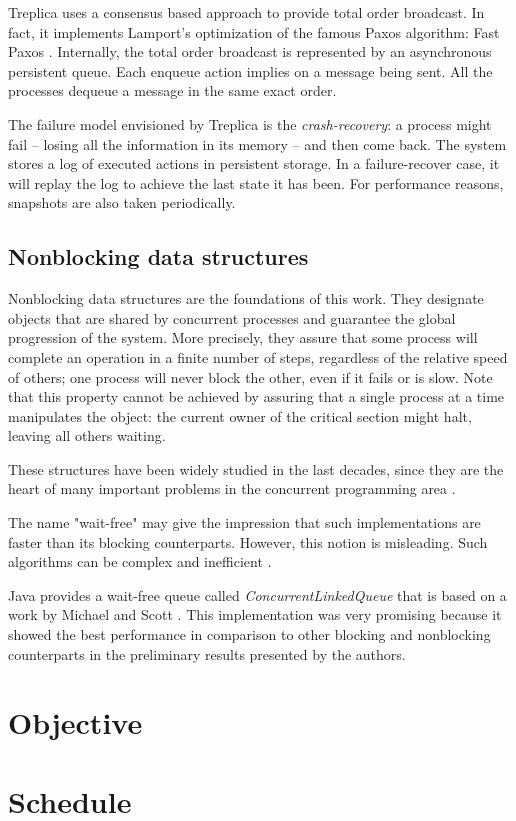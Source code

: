\documentclass[12pt]{article}
\begin{document}
Treplica uses a consensus based approach to provide total order broadcast. In
fact, it implements Lamport's optimization of the famous Paxos
\cite{lamport1998part} algorithm: Fast Paxos \cite{Lamport2006}. Internally, the
total order broadcast is represented by an asynchronous persistent queue. Each
enqueue action implies on a message being sent. All the processes dequeue a
message in the same exact order.

The failure model envisioned by Treplica is the \textit{crash-recovery}: a
process might fail -- losing all the information in its memory -- and then come
back. The system stores a log of executed actions in persistent storage. In a
failure-recover case, it will replay the log to achieve the last state it has
been. For performance reasons, snapshots are also taken periodically.




\subsection{Nonblocking data structures}
Nonblocking data structures are the foundations of this work. They designate
objects that are shared by concurrent processes and guarantee the global
progression of the system. More precisely, they  assure that some process will
complete an operation in a finite number of steps, regardless of the relative
speed of others; one process will never block the other, even if it fails or is
slow. Note that this  property cannot be achieved by assuring that a single
process at a time manipulates the object: the current owner of the critical
section might halt, leaving all others waiting.

These structures have been widely studied in the last decades, since they are
the heart of many important problems in the concurrent programming area
\cite{herlihy2011art}.

The name "wait-free" may give the impression that such implementations are
faster than its blocking counterparts. However, this notion is misleading.  Such
algorithms can be complex and inefficient \cite{attiya1994wait}.

Java provides a wait-free queue called \textit{ConcurrentLinkedQueue} that is
based on a work by Michael and Scott \cite{michael1996simple}. This
implementation was very promising because it showed the best performance in
comparison to other blocking and nonblocking counterparts in the preliminary
results presented by the authors.


\section{Objective}
\label{sec:contrib}



\section{Schedule}
\label{sec:schedule}


\vskip 15mm

{}

\end{document}
